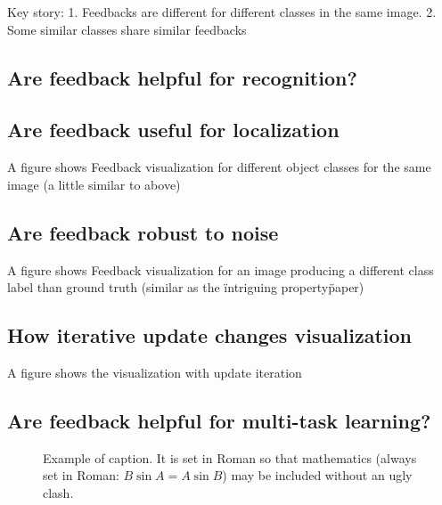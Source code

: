 \documentclass[10pt,twocolumn,letterpaper]{article}
\begin{document}
Key story: 1. Feedbacks are different for different classes in the same image. 2. Some similar classes share similar feedbacks

\subsection{Are feedback helpful for recognition?}

\subsection{Are feedback useful for localization}
A figure shows Feedback visualization for different object classes for the same image (a little similar to above)

\subsection{Are feedback robust to noise}
A figure shows Feedback visualization for an image producing a different class label than ground truth (similar as the \"intriguing property\" paper)

\subsection{How iterative update changes visualization}
A figure shows the visualization with update iteration

\subsection{Are feedback helpful for multi-task learning?}


\begin{figure}[t]
\begin{center}
\fbox{\rule{0pt}{2in} \rule{0.9\linewidth}{0pt}}
\end{center}
   \caption{Example of caption.  It is set in Roman so that mathematics
   (always set in Roman: $B \sin A = A \sin B$) may be included without an
   ugly clash.}
\label{fig:long}
\label{fig:onecol}
\end{figure}

{\small


}
\end{document}
